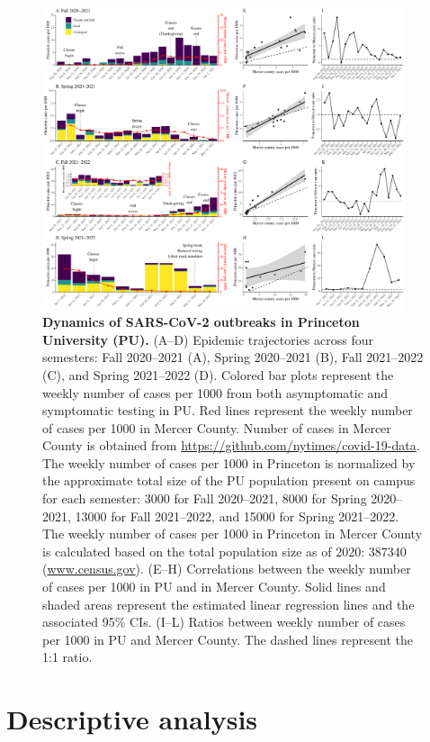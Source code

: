 \documentclass[12pt]{article}
\begin{document}
\begin{figure}[!th]
\includegraphics[width=0.95\textwidth]{../figure_princeton_new/figure_princeton_new_per_1000.pdf}
\caption{
\textbf{Dynamics of SARS-CoV-2 outbreaks in Princeton University (PU).}
(A--D) Epidemic trajectories across four semesters: Fall 2020--2021 (A), Spring 2020--2021 (B), Fall 2021--2022 (C), and Spring 2021--2022 (D).
Colored bar plots represent the weekly number of cases per 1000 from both asymptomatic and symptomatic testing in PU.
Red lines represent the weekly number of cases per 1000 in Mercer County.
Number of cases in Mercer County is obtained from \url{https://github.com/nytimes/covid-19-data}.
The weekly number of cases per 1000 in Princeton is normalized by the approximate total size of the PU population present on campus for each semester: 3000 for Fall 2020--2021, 8000 for Spring 2020--2021, 13000 for Fall 2021--2022, and 15000 for Spring 2021--2022.
The weekly number of cases per 1000 in Princeton in Mercer County is calculated based on the total population size as of 2020: 387340 (\url{www.census.gov}).
(E--H) Correlations between the weekly number of cases per 1000 in PU and in Mercer County.
Solid lines and shaded areas represent the estimated linear regression lines and the associated 95\% CIs.
(I--L) Ratios between weekly number of cases per 1000 in PU and Mercer County.
The dashed lines represent the 1:1 ratio.
\label{fig:princeton}
}
\end{figure}

\section*{Descriptive analysis}
\end{document}
